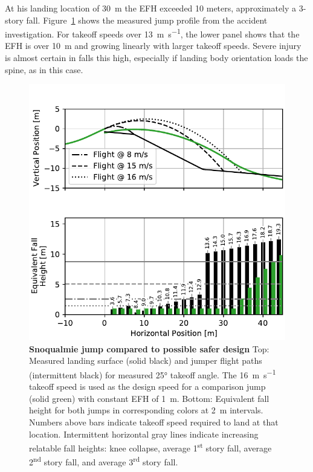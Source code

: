 \documentclass{article}
\begin{document}
At his landing location of 30~\si{\meter} the EFH exceeded 10 meters,
approximately a 3-story fall. Figure~\ref{fig:salvini-v-snoqualmie} shows the
measured jump profile from the accident investigation.  For takeoff speeds
over 13~\si{\meter\per\second}, the lower panel shows that the EFH is
over 10~\si{\meter} and growing linearly with larger takeoff speeds.
Severe injury is almost certain in falls this high, especially if landing body
orientation loads the spine, as in this case.
%
\begin{figure}
  \centering
  \includegraphics[width=\columnwidth]{figures/salvini-v-snoqualmie.pdf}
  \caption{\textbf{Snoqualmie jump compared to possible safer design}
  Top: Measured landing surface (solid black) and jumper flight paths
  (intermittent black) for measured 25\si{\degree} takeoff angle. The
  16~\si{\meter\per\second} takeoff speed is used as the design speed for a
  comparison jump (solid green) with constant EFH of
  1~\si{\meter}.
  Bottom: Equivalent fall height for both jumps in corresponding colors at
  2~\si{\meter} intervals. Numbers above bars indicate takeoff speed required
  to land at that location.
  Intermittent horizontal gray lines indicate increasing relatable fall
  heights: knee collapse, average 1\textsuperscript{st} story fall, average
  2\textsuperscript{nd} story fall, and average 3\textsuperscript{rd} story
  fall.
  }
  \label{fig:salvini-v-snoqualmie}
\end{figure}
\end{document}
